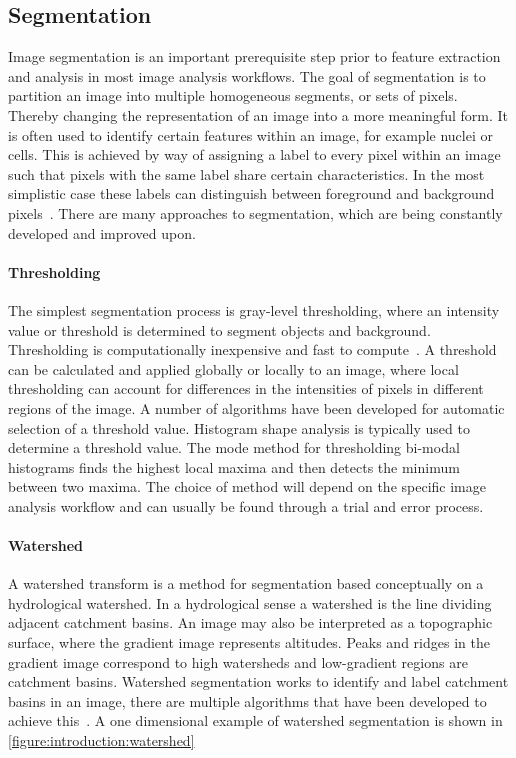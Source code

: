 \subsection{Segmentation}
\label{introduction:image_processing:segmentation}
Image segmentation is an important prerequisite step prior to feature extraction and analysis in most image analysis workflows. The goal of segmentation is to partition an image into multiple homogeneous segments, or sets of pixels. Thereby changing the representation of an image into a more meaningful form. It is often used to identify certain features within an image, for example nuclei or cells. This is achieved by way of assigning a label to every pixel within an image such that pixels with the same label share certain characteristics. In the most simplistic case these labels can distinguish between foreground and background pixels~\cite{Russ2006}. There are many approaches to segmentation, which are being constantly developed and improved upon.

\paragraph{Thresholding} The simplest segmentation process is gray-level thresholding, where an intensity value or threshold is determined to segment objects and background. Thresholding is computationally inexpensive and fast to compute~\cite{Sonka2007}. A threshold can be calculated and applied globally or locally to an image, where local thresholding can account for differences in the intensities of pixels in different regions of the image. A number of algorithms have been developed for automatic selection of a threshold value. Histogram shape analysis is typically used to determine a threshold value. The mode method for thresholding bi-modal histograms finds the highest local maxima and then detects the minimum between two maxima. The choice of method will depend on the specific image analysis workflow and can usually be found through a trial and error process.

\paragraph{Watershed} A watershed transform is a method for segmentation based conceptually on a hydrological watershed. In a hydrological sense a watershed is the line dividing adjacent catchment basins. An image may also be interpreted as a topographic surface, where the gradient image represents altitudes. Peaks and ridges in the gradient image correspond to high watersheds and low-gradient regions are catchment basins. Watershed segmentation works to identify and label catchment basins in an image, there are multiple algorithms that have been developed to achieve this~\cite{Roerdink2000}. A one dimensional example of watershed segmentation is shown in \autoref{figure:introduction:watershed}

